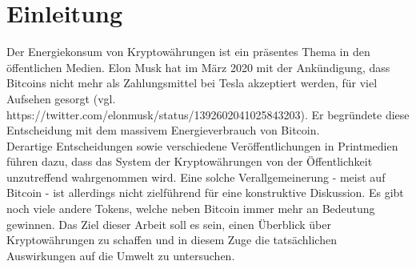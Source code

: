 \documentclass[12pt]{article}
\begin{document}
    \renewcommand{\mytitle}{Entwicklung und Bewertung eines Kennzahlen-\\systems für nachhaltige Kryptowährungen}%
\renewcommand{\myauthor}{Michael Eing, Vanessa Kriebel,\\Timo Stovermann, Bastian Wynk}%
\renewcommand{\headheight}{27pt}%



    \frontmatter%

   
    \renewcommand{\plaintitle}{Inhaltsverzeichnis}%
    {\def\makebox[#1][#2]#3{#3}%
        \tableofcontents
    }

    \clearpage
    \renewcommand{\plaintitle}{Abkürzungsverzeichnis}
    \printabbreviations%
    \clearpage
    \renewcommand{\plaintitle}{Abbildungsverzeichnis}
    {\def\makebox[#1][#2]#3{#3}%
        \listoffigures
    }
    \clearpage

    
    \mainmatter%
    
    \useInlineCites

	\part{Einleitung}
Der Energiekonsum von Kryptowährungen ist ein präsentes Thema in den öffentlichen Medien. Elon Musk hat im März 2020 mit der Ankündigung, dass Bitcoins nicht mehr als Zahlungsmittel bei Tesla akzeptiert werden, für viel Aufsehen gesorgt (vgl. https://twitter.com/elonmusk/status/1392602041025843203). Er begründete diese Entscheidung mit dem massivem Energieverbrauch von Bitcoin.\\
Derartige Entscheidungen sowie verschiedene Veröffentlichungen in Printmedien führen dazu, dass das System der Kryptowährungen von der Öffentlichkeit unzutreffend wahrgenommen wird. Eine solche Verallgemeinerung - meist auf Bitcoin - ist allerdings nicht zielführend für eine konstruktive Diskussion. Es gibt noch viele andere Tokens, welche neben Bitcoin immer mehr an Bedeutung gewinnen. Das Ziel dieser Arbeit soll es sein, einen Überblick über Kryptowährungen zu schaffen und in diesem Zuge die tatsächlichen Auswirkungen auf die Umwelt zu untersuchen.
\end{document}
